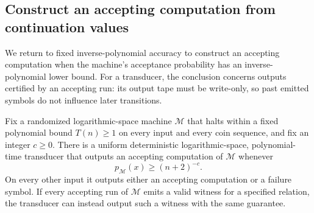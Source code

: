 \subsection{Construct an accepting computation from continuation values}

We return to fixed inverse-polynomial accuracy to construct an accepting
computation when the machine's acceptance probability has an
inverse-polynomial lower bound.
For a transducer, the conclusion concerns outputs certified by an
accepting run: its output tape must be write-only, so past emitted
symbols do not influence later transitions.

\begin{corollary}
\label{cor:certified-search}
Fix a randomized logarithmic-space machine $\mathcal M$ that halts
within a fixed polynomial bound $T(n)\ge1$ on every input and every
coin sequence, and fix an integer $c\ge0$. There is a uniform
deterministic logarithmic-space, polynomial-time transducer that
outputs an accepting computation of $\mathcal M$ whenever
\[
 p_{\mathcal M}(x)\ge(n+2)^{-c}.
\]
On every other input it outputs either an accepting computation or
a failure symbol. If every accepting run of $\mathcal M$ emits a
valid witness for a specified relation, the transducer can instead
output such a witness with the same guarantee.
\end{corollary}

